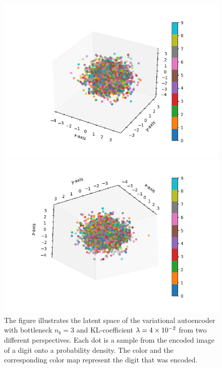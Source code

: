 \begin{figure}
\begin{center}
   \begin{minipage}[b]{0.49\linewidth}
      \includegraphics[trim = 20mm 10mm 20mm 10mm, clip, width=\linewidth]{convolutional_VAE_snd_KL_4e-2_10k_epochs_3D_latent_1}
	\end{minipage}
   \begin{minipage}[b]{0.49\linewidth}
      \includegraphics[trim = 20mm 10mm 20mm 10mm, clip, width=\linewidth]{convolutional_VAE_snd_KL_4e-2_10k_epochs_3D_latent_2}
	\end{minipage}
\end{center}
\caption{The figure illustrates the latent space of the variational autoencoder with bottleneck $n_b=3$ and KL-coefficient $\lambda = \num{4e-2}$ from two different perspectives. Each dot is a sample from the encoded image of a digit onto a probability density. The color and the corresponding color map represent the digit that was encoded.}\label{fig:convolutional_VAE_snd_KL_4e-2_10k_epochs_3D_latent}
\end{figure}


